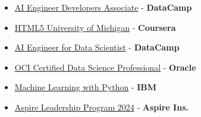 \documentclass[a4paper,12pt]{article}
\begin{document}
\begin{multicols}{2}
\begin{itemize}[leftmargin=*, nosep, itemsep=0pt, parsep=0pt] %
    \item \href{https://www.datacamp.com/certificate/AIEDA0014623486342}{AI Engineer Developers Associate} - \textbf{DataCamp}
    \item \href{https://www.coursera.org/account/accomplishments/verify/PW72RW7XK7YE}{HTML5 University of Michigan} - \textbf{Coursera}
    \item\href{https://drive.google.com/file/d/1yJVLWXUgIGJJDrrejNTelkiqS0GaD6a-/view}{AI Engineer for Data Scientist} - \textbf{DataCamp}
    \item \href{https://catalog-education.oracle.com/ords/certview/sharebadge?id=85755CE3A7768750DC03B66057C287E248E28CBD6148E7C7A80E652DE723BD67}{OCI Certified Data Science Professional} - \textbf{Oracle}
    \item \href{https://www.credly.com/badges/d103bf8a-4805-4b9d-9b26-3e059e82adb4}{Machine Learning with Python} - \textbf{IBM}
    \item \href{https://drive.google.com/file/d/1iPrsE-_qzPNVt0iHAw2ff8W8uuz_n_8Z/view?usp=sharing}{Aspire Leadership Program 2024} - \textbf{Aspire Ins.}


\end{itemize}
\end{multicols}
\vspace{-8pt} 
\end{document}
